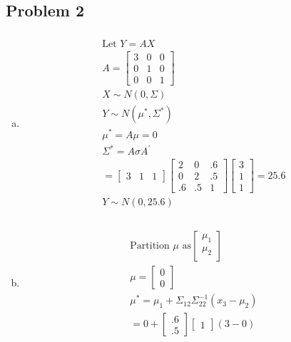 \documentclass{article}
\begin{document}
\begin{flushleft}
	\section*{Problem 2}
\begin{enumerate}[(a)]
	\item 
\begin{multline*}\\
\text{Let } Y=AX\\
A=\begin{bmatrix}
3&0&0\\
0&1&0\\
0&0&1
\end{bmatrix}\\
X\sim N(0,\Sigma)\\
Y\sim N(\mu^*,\Sigma^*)\\
\mu^*=A\mu=0\\
\Sigma^*=A\sigma A^{'}\\
=\begin{bmatrix}
3&1&1
\end{bmatrix}
\begin{bmatrix}
2&0&.6\\
0&2&.5\\
.6&.5&1
\end{bmatrix}
\begin{bmatrix}
3\\
1\\
1
\end{bmatrix}=25.6\\
Y\sim N(0,25.6)\\
\end{multline*}
	\item 
\begin{multline*}\\
\text{Partition } \mu \text{ as} \begin{bmatrix}
\mu_1\\
\mu_2\\
\end{bmatrix}\\
\mu =\begin{bmatrix}
0\\
0
\end{bmatrix}\\
\mu^*=\mu_1+\Sigma_{12}\Sigma_{22}^{-1}(x_3-\mu_2)\\
=0+\begin{bmatrix}
.6\\
.5
\end{bmatrix}
\begin{bmatrix}
1
\end{bmatrix}(3-0)\\

\end{multline*}
\end{enumerate}
\end{flushleft}
\end{document}

